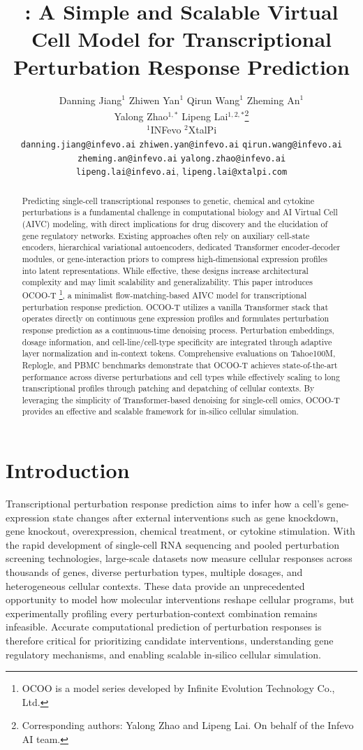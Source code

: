 \documentclass[11pt]{article}
\title{
  \vspace{-1.0em}\textbf{{\ocoot: A Simple and Scalable Virtual Cell Model for Transcriptional Perturbation Response Prediction}}
}
\author{
\begin{tabular}{c}
Danning Jiang$^{1}$ \quad Zhiwen Yan$^{1}$ \quad Qirun Wang$^{1}$ \quad Zheming An$^{1}$ \\ 
\quad Yalong Zhao$^{1,*}$ \quad Lipeng Lai$^{1,2,*}$\thanks{Corresponding authors: Yalong Zhao and Lipeng Lai. On behalf of the Infevo AI team.}\\
{\small $^{1}$INFevo \quad $^{2}$XtalPi} \\
{\small\texttt{danning.jiang@infevo.ai} \quad \texttt{zhiwen.yan@infevo.ai} \quad \texttt{qirun.wang@infevo.ai} }\\
{\quad \texttt{zheming.an@infevo.ai} \small\texttt{yalong.zhao@infevo.ai}} \\
{ \quad \texttt{lipeng.lai@infevo.ai}, \texttt{lipeng.lai@xtalpi.com}}
\end{tabular}}
\date{}
\newcommand{\ocoot}{OCOO-T }
\begin{document}
\maketitle

\begin{abstract}
  Predicting single-cell transcriptional responses to genetic, chemical and cytokine perturbations is a fundamental challenge in computational biology and AI Virtual Cell (AIVC) modeling, with direct implications for drug discovery and the elucidation of gene regulatory networks. Existing approaches often rely on auxiliary cell-state encoders, hierarchical variational autoencoders, dedicated Transformer encoder-decoder modules, or gene-interaction priors to compress high-dimensional expression profiles into latent representations. While effective, these designs increase architectural complexity and may limit scalability and generalizability. This paper introduces \ocoot\footnote{OCOO is a model series developed by Infinite Evolution Technology Co., Ltd.}, a minimalist flow-matching-based AIVC model for transcriptional perturbation response prediction. OCOO-T utilizes a vanilla Transformer stack that operates directly on continuous gene expression profiles and formulates perturbation response prediction as a continuous-time denoising process. Perturbation embeddings, dosage information, and cell-line/cell-type specificity are integrated through adaptive layer normalization and in-context tokens. Comprehensive evaluations on Tahoe100M, Replogle, and PBMC benchmarks demonstrate that OCOO-T achieves state-of-the-art performance across diverse perturbations and cell types while effectively scaling to long transcriptional profiles through patching and depatching of cellular contexts. By leveraging the simplicity of Transformer-based denoising for single-cell omics, OCOO-T provides an effective and scalable framework for in-silico cellular simulation.
\end{abstract}

\section{Introduction}

Transcriptional perturbation response prediction aims to infer how a cell's gene-expression state changes after external interventions such as gene knockdown, gene knockout, overexpression, chemical treatment, or cytokine stimulation. With the rapid development of single-cell RNA sequencing and pooled perturbation screening technologies, large-scale datasets now measure cellular responses across thousands of genes, diverse perturbation types, multiple dosages, and heterogeneous cellular contexts. These data provide an unprecedented opportunity to model how molecular interventions reshape cellular programs, but experimentally profiling every perturbation-context combination remains infeasible. Accurate computational prediction of perturbation responses is therefore critical for prioritizing candidate interventions, understanding gene regulatory mechanisms, and enabling scalable in-silico cellular simulation.
\end{document}
